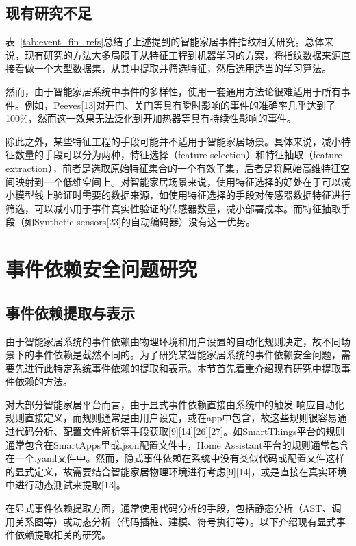 \subsection{现有研究不足}

表~\ref{tab:event_fin_refs}总结了上述提到的智能家居事件指纹相关研究。总体来说，现有研究的方法大多局限于从特征工程到机器学习的方案，将指纹数据来源直接看做一个大型数据集，从其中提取并筛选特征，然后选用适当的学习算法。

然而，由于智能家居系统中事件的多样性，使用一套通用方法论很难适用于所有事件。例如，Peeves[13]对开门、关门等具有瞬时影响的事件的准确率几乎达到了100\%，然而这一效果无法泛化到开加热器等具有持续性影响的事件。

除此之外，某些特征工程的手段可能并不适用于智能家居场景。具体来说，减小特征数量的手段可以分为两种，特征选择（feature selection）和特征抽取（feature extraction），前者是选取原始特征集合的一个有效子集，后者是将原始高维特征空间映射到一个低维空间上。对智能家居场景来说，使用特征选择的好处在于可以减小模型线上验证时需要的数据来源，如使用特征选择的手段对传感器数据特征进行筛选，可以减小用于事件真实性验证的传感器数量，减小部署成本。而特征抽取手段（如Synthetic sensors[23]的自动编码器）没有这一优势。

\section{事件依赖安全问题研究}

\subsection{事件依赖提取与表示}

由于智能家居系统的事件依赖由物理环境和用户设置的自动化规则决定，故不同场景下的事件依赖是截然不同的。为了研究某智能家居系统的事件依赖安全问题，需要先进行此特定系统事件依赖的提取和表示。本节首先着重介绍现有研究中提取事件依赖的方法。

对大部分智能家居平台而言，由于显式事件依赖直接由系统中的触发-响应自动化规则直接定义，而规则通常是由用户设定，或在app中包含，故这些规则很容易通过代码分析、配置文件解析等手段获取[9][14][26][27]。如SmartThings平台的规则通常包含在SmartApps里或.json配置文件中，Home Assistant平台的规则通常包含在一个.yaml文件中。然而，隐式事件依赖在系统中没有类似代码或配置文件这样的显式定义，故需要结合智能家居物理环境进行考虑[9][14]，或是直接在真实环境中进行动态测试来提取[13]。

在显式事件依赖提取方面，通常使用代码分析的手段，包括静态分析（AST、调用关系图等）或动态分析（代码插桩、建模、符号执行等）。以下介绍现有显式事件依赖提取相关的研究。

